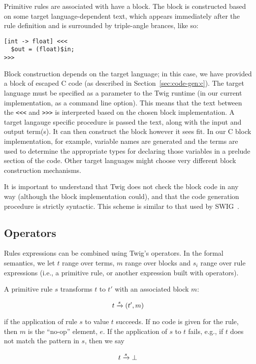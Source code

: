 Primitive rules are associated with have a block. The block is constructed based on some target language-dependent text, which appears immediately after the rule definition and is surrounded by triple-angle brances, like so:

\begin{verbatim}
[int -> float] <<<
  $out = (float)$in;
>>>
\end{verbatim}

Block construction depends on the target language; in this case, we have provided a block of escaped C code (as described in Section~\ref{sec:code-gen:c}). The target language must be specified as a parameter to the Twig runtime (in our current implementation, as a command line option). This means that the text between the \verb|<<<| and \verb|>>>| is interpreted based on the chosen block implementation. A target langauge specific procedure is passed the text, along with the input and output term(s). It can then construct the block however it sees fit. In our C block implementation, for example, variable names are generated and the terms are used to determine the appropriate types for declaring those variables in a prelude section of the code. Other target languages might choose very different block construction mechanisms.

It is important to understand that Twig does not check the block code in any way (although the block implementation could), and that the code generation procedure is strictly syntactic. This scheme is similar to that used by SWIG~\cite{swig}.

\subsection{Operators}

Rules expressions can be combined using Twig's operators. In the formal semantics, we let $t$ range over terms, $m$ range over blocks and $s_i$ range over rule expressions (i.e., a primitive rule, or another expression built with operators).

A primitive rule $s$ transforms $t$ to $t'$ with an associated  block $m$:

\[
t \xrightarrow{s} (t',m)
\]

if the application of rule $s$ to value $t$ succeeds. If no code is given for the rule, then $m$ is the ``no-op'' element, $e$. If the application of $s$ to $t$ fails, e.g., if $t$ does not match the pattern in $s$, then we say

\[
t \xrightarrow{s} \bot
\]

